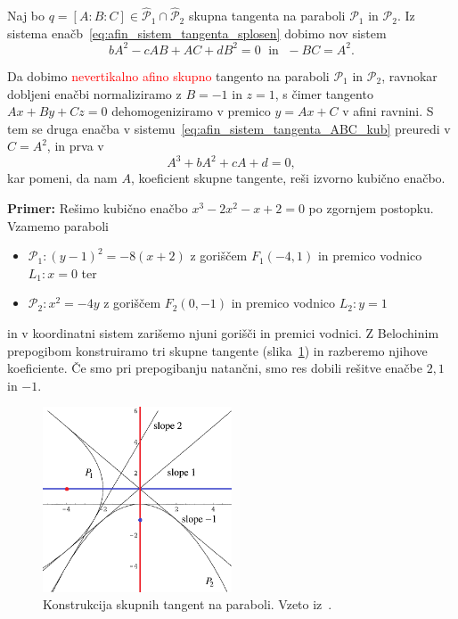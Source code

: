 Naj bo $q = [A : B : C] \in \mathcal{\hat{P}}_1 \cap \mathcal{\hat{P}}_2$ skupna tangenta na paraboli $\mathcal{P}_1$ in $\mathcal{P}_2$. Iz sistema enačb~\ref{eq:afin_sistem_tangenta_splosen} dobimo nov sistem
\begin{equation}
    \label{eq:afin_sistem_tangenta_ABC_kub}
    bA^2 - cAB + AC + dB^2 = 0 \; \text{ in } \; -BC = A^2.
\end{equation}

Da dobimo \textcolor{red}{nevertikalno afino skupno} tangento na paraboli $\mathcal{P}_1$ in $\mathcal{P}_2$, ravnokar dobljeni enačbi normaliziramo z $B = -1$ in $z = 1$, s čimer tangento $Ax + By + Cz = 0$ dehomogeniziramo v premico $y = Ax + C$ v afini ravnini. S tem se druga enačba v sistemu~\ref{eq:afin_sistem_tangenta_ABC_kub} preuredi v $C = A^2$, in prva v
$$ A^3 + bA^2 + cA + d = 0,$$
kar pomeni, da nam $A$, koeficient skupne tangente, reši izvorno kubično enačbo.


\textbf{Primer:} Rešimo kubično enačbo $x^3 - 2x^2 - x + 2 = 0$ po zgornjem postopku. Vzamemo paraboli
\begin{itemize}
    \item $\mathcal{P}_1: (y-1)^2 = -8(x+2)$ z goriščem $F_1 (-4, 1)$ in premico vodnico $L_1: x = 0$ ter
    \item $\mathcal{P}_2: x^2 = -4y$ z goriščem $F_2 (0, -1)$ in premico vodnico $L_2: y = 1$
\end{itemize}
in v koordinatni sistem zarišemo njuni gorišči in premici vodnici. Z Belochinim prepogibom konstruiramo tri skupne tangente (slika~\ref{fig:kubicna_tang_primer}) in razberemo njihove koeficiente. Če smo pri prepogibanju natančni, smo res dobili rešitve enačbe $2, 1$ in $-1$.

\begin{figure}[h]
    \centering
    \includegraphics[width=0.5\textwidth]{images/kubicna_tang_primer1.png}
    \caption[Primer reševanja kubične enačbe s tangentami]{Konstrukcija skupnih tangent na paraboli. Vzeto iz~\cite[str.\ 22]{edwards2001}.}
    \label{fig:kubicna_tang_primer}
\end{figure}

